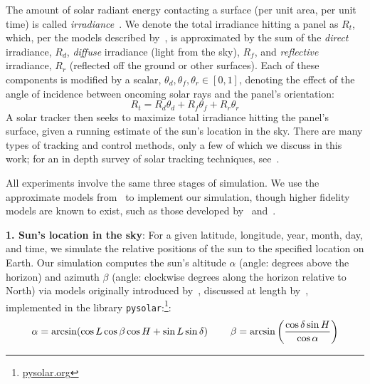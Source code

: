 \documentclass[11pt]{article}
\begin{document}
The amount of solar radiant energy contacting a surface (per unit area, per unit time) is called {\it irradiance}~\cite{goswami2000principles}.  We denote the total irradiance hitting a panel as $R_t$, which, per the models described by~\citet{kamali2006estimating}, is approximated by the sum of the {\it direct} irradiance, $R_d$, {\it diffuse} irradiance (light from the sky), $R_f$, and {\it reflective} irradiance, $R_r$ (reflected off the ground or other surfaces). Each of these components is modified by a scalar, $\theta_d, \theta_f, \theta_r \in [0,1]$, denoting the effect of the angle of incidence between oncoming solar rays and the panel's orientation:
\begin{equation}
R_t = R_d \theta_d + R_f \theta_f + R_r \theta_r
\label{eq:total_rads}
\end{equation}
A solar tracker then seeks to maximize total irradiance hitting the panel's surface, given a running estimate of the sun's location in the sky. There are many types of tracking and control methods, only a few of which we discuss in this work; for an in depth survey of solar tracking techniques, see~\citet{mousazadeh2009review}.

All experiments involve the same three stages of simulation. We use the approximate models from~\citet{masters2013renewable} to implement our simulation, though higher fidelity models are known to exist, such as those developed by~\citet{andersen1980comments,klein1977calculation} and~\citet{kamali2006estimating}. %

{\bf 1. Sun's location in the sky}: For a given latitude, longitude, year, month, day, and time, we simulate the relative positions of the sun to the specified location on Earth. Our simulation computes the sun's altitude $\alpha$ (angle: degrees above the horizon) and azimuth $\beta$ (angle: clockwise degrees along the horizon relative to North) via models originally introduced by~\citet{jordan1958chafer}, discussed at length by~\citet{masters2013renewable}, implemented in the library \texttt{pysolar}:\footnote{\url{pysolar.org}}:
\begin{equation}
\alpha = \arcsin(\cos L \cos \beta \cos H + \sin L \sin \delta) \hspace{8mm} \beta = \arcsin\left(\frac{\cos \delta \sin H}{\cos \alpha}\right)
\end{equation}
\end{document}
